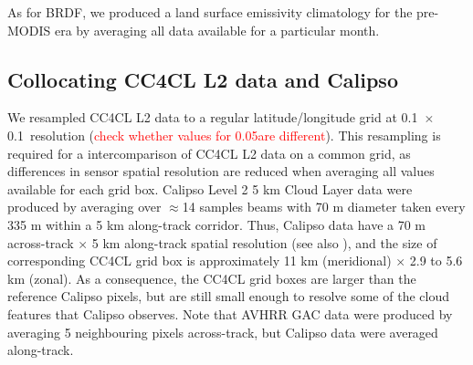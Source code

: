 As for BRDF, we produced a land surface emissivity climatology for the pre-MODIS era by averaging all data available for a particular month.

\subsection{Collocating CC4CL L2 data and Calipso}

We resampled CC4CL L2 data to a regular latitude/longitude grid at 0.1\textdegree\ $\times$ 0.1\textdegree\ resolution (\textcolor{red}{check whether values for 0.05\textdegree are different}). This resampling is required for a intercomparison of CC4CL L2 data on a common grid, as differences in sensor spatial resolution are reduced when averaging all values available for each grid box. Calipso Level 2 5 km Cloud Layer data were produced by averaging over $\approx$14 samples beams with 70 m diameter taken every 335 m within a 5 km along-track corridor. Thus, Calipso data have a 70 m across-track $\times$ 5 km along-track spatial resolution (see also \citet{Holz08}), and the size of corresponding CC4CL grid box is approximately 11 km (meridional) $\times$ 2.9 to 5.6 km (zonal). As a consequence, the CC4CL grid boxes are larger than the reference Calipso pixels, but are still small enough to resolve some of the cloud features that Calipso observes. Note that AVHRR GAC data were produced by averaging 5 neighbouring pixels across-track, but Calipso data were averaged along-track.

